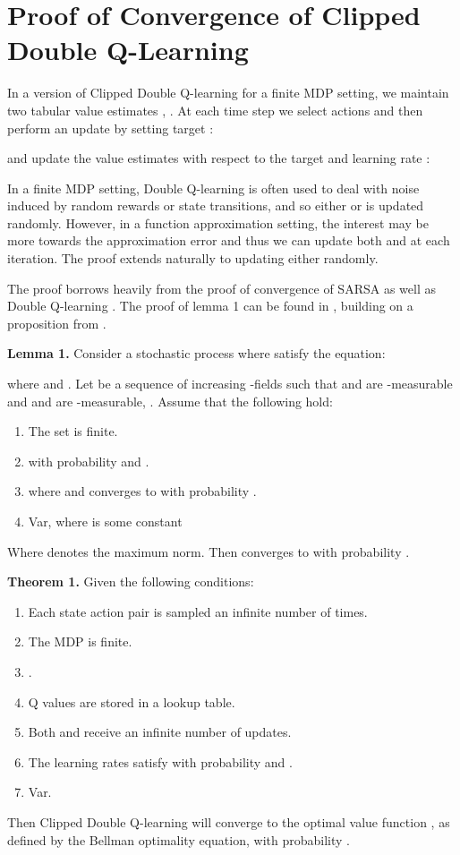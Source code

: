 \documentclass{article}
\begin{document}



\clearpage
\onecolumn



\appendix


\section{Proof of Convergence of Clipped Double Q-Learning} \label{sec:sm_proof}


In a version of Clipped Double Q-learning for a finite MDP setting, we maintain two tabular value estimates , . At each time step we select actions  and then perform an update by setting target :

and update the value estimates with respect to the target and learning rate : 


In a finite MDP setting, Double Q-learning is often used to deal with noise induced by random rewards or state transitions, and so either  or  is updated randomly. However, in a function approximation setting, the interest may be more towards the approximation error and thus we can update both  and  at each iteration. The proof extends naturally to updating either randomly. 

The proof borrows heavily from the proof of convergence of SARSA \cite{singh2000convergence} as well as Double Q-learning \cite{hasselt2010double}. The proof of lemma 1 can be found in \citet{singh2000convergence}, building on a proposition from \citet{bertsekas1995dynamic}. 

\textbf{Lemma 1.} Consider a stochastic process  where  satisfy the equation:

where  and . Let  be a sequence of increasing -fields such that  and  are -measurable and  and  are -measurable, . Assume that the following hold:
\begin{enumerate}[topsep=0pt]
\item The set  is finite.
\item  with probability  and .
\item  where  and  converges to  with probability .
\item Var, where  is some constant 
\end{enumerate}
Where  denotes the maximum norm. Then  converges to  with probability . 

\textbf{Theorem 1.} Given the following conditions:
\begin{enumerate}[topsep=0pt]
\item Each state action pair is sampled an infinite number of times. 
\item The MDP is finite. 
\item .
\item Q values are stored in a lookup table.
\item Both  and  receive an infinite number of updates.
\item The learning rates satisfy  with probability  and .
\item Var. 
\end{enumerate}
Then Clipped Double Q-learning will converge to the optimal value function , as defined by the Bellman optimality equation, with probability .
\end{document}
